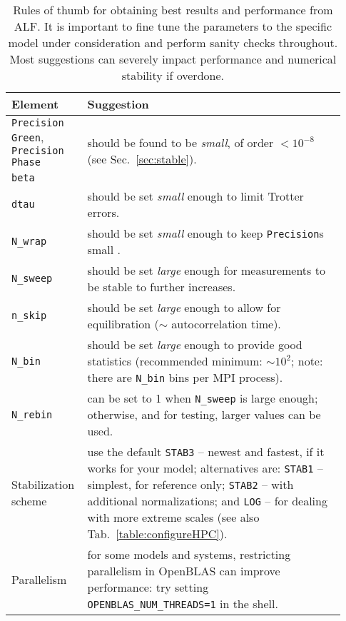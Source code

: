 \begin{table}[h!]
	\begin{center}
		\begin{tabular}{@{} p{0.18\linewidth} p{0.75\linewidth} @{}}\toprule
			Element & Suggestion  \\ \midrule
			\texttt{Precision Green}, \texttt{Precision Phase}  &  \multirow{2}{*}{should be found to be \emph{small}, of order $< 10^{-8}$ (see Sec.~\ref{sec:stable}).}\\
			\texttt{beta} & should typically be set \emph{large} enough. \\
			\texttt{dtau} & should be set \emph{small} enough to limit Trotter errors.\\
			\texttt{N\_wrap} & should be set \emph{small} enough to keep \texttt{Precision}s small .\\
			\texttt{N\_sweep} & should be set \emph{large} enough for measurements to be stable to further increases.\\
			\texttt{n\_skip} & should be set \emph{large} enough to allow for equilibration ($\sim$ autocorrelation time). \\
			\texttt{N\_bin} & should be set \emph{large} enough to provide good statistics (recommended minimum: $\sim 10^2$; note: there are \texttt{N\_bin} bins per MPI process). \\
			\texttt{N\_rebin} & can be set to 1 when \texttt{N\_sweep} is large enough; otherwise, and for testing, larger values can be used.\\
			Stabilization scheme & use the default \texttt{STAB3} -- newest and fastest, if it works for your model; alternatives are: \texttt{STAB1} -- simplest, for reference only; \texttt{STAB2} -- with additional normalizations; and \texttt{LOG} -- for dealing with more extreme scales (see also Tab.~\ref{table:configureHPC}). \\
			Parallelism & for some models and systems, restricting parallelism in OpenBLAS can improve performance: try setting \texttt{OPENBLAS\_NUM\_THREADS=1} in the shell. \\\bottomrule
		\end{tabular}
		\caption{Rules of thumb for obtaining best results and performance from ALF. It is important to fine tune the parameters to the specific model under consideration and perform sanity checks throughout. Most suggestions can severely impact performance and numerical stability if overdone. \label{table:tips}}
	\end{center}
\end{table}


